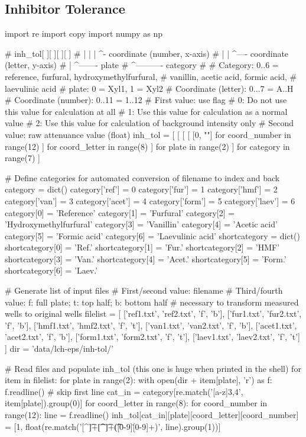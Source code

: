 \subsection{Inhibitor Tolerance\label{subsec-inh-hts-results}}
\begin{pycode}
import re
import copy
import numpy as np

# inh_tol[ ][ ][ ][ ]
#         |  |  |  ^- coordinate (number, x-axis)
#         |  |  ^---- coordinate (letter, y-axis)
#         |  ^------- plate
#         ^---------- category
#
# Category: 0..6 = reference, furfural, hydroxymethylfurfural,
#                  vanillin, acetic acid, formic acid,
#                  laevulinic acid
# plate: 0 = Xyl1, 1 = Xyl2
# Coordinate (letter): 0...7 = A..H
# Coordinate (number): 0..11 = 1..12
# First value: use flag
#    0: Do not use this value for calculation at all
#    1: Use this value for calculation as a normal value
#    2: Use this value for calculation of background intensity only
# Second value: raw attenuance value (float)
inh_tol = [
    [
        [
            [
                [0, ""] for coord_number in range(12)
            ]
             for coord_letter in range(8)
        ]
        for plate in range(2)
    ]
    for category in range(7)
]

# Define categories for automated conversion of filename to index and back
category = dict()
category['ref'] = 0
category['fur'] = 1
category['hmf'] = 2
category['van'] = 3
category['acet'] = 4
category['form'] = 5
category['laev'] = 6
category[0] = 'Reference'
category[1] = 'Furfural'
category[2] = 'Hydroxymethylfurfural'
category[3] = 'Vanillin'
category[4] = 'Acetic acid'
category[5] = 'Formic acid'
category[6] = 'Laevulinic acid'
shortcategory = dict()
shortcategory[0] = 'Ref.'
shortcategory[1] = 'Fur.'
shortcategory[2] = 'HMF'
shortcategory[3] = 'Van.'
shortcategory[4] = 'Acet.'
shortcategory[5] = 'Form.'
shortcategory[6] = 'Laev.'

# Generate list of input files
# First/second value: filename
# Third/fourth value: f: full plate; t: top half; b: bottom half
#     necessary to transform measured wells to original wells
filelist = [
    ['ref1.txt', 'ref2.txt', 'f', 'b'],
    ['fur1.txt', 'fur2.txt', 'f', 'b'],
    ['hmf1.txt', 'hmf2.txt', 'f', 't'],
    ['van1.txt', 'van2.txt', 'f', 'b'],
    ['acet1.txt', 'acet2.txt', 'f', 'b'],
    ['form1.txt', 'form2.txt', 'f', 't'],
    ['laev1.txt', 'laev2.txt', 'f', 't']
]
dir = 'data/lch-eps/inh-tol/'

# Read files and populate inh_tol (this one is huge when printed in the shell)
for item in filelist:
    for plate in range(2):
        with open(dir + item[plate], 'r') as f:
            f.readline() # skip first line
            cat_in = category[re.match('[a-z]{3,4}', item[plate]).group(0)]
            for coord_letter in range(8):
                for coord_number in range(12):
                    line = f.readline()
                    inh_tol[cat_in][plate][coord_letter][coord_number] = [1, float(re.match('[^\t]+\t[^\t]+\t([0-9]\.[0-9]+)', line).group(1))]


\end{pycode}
